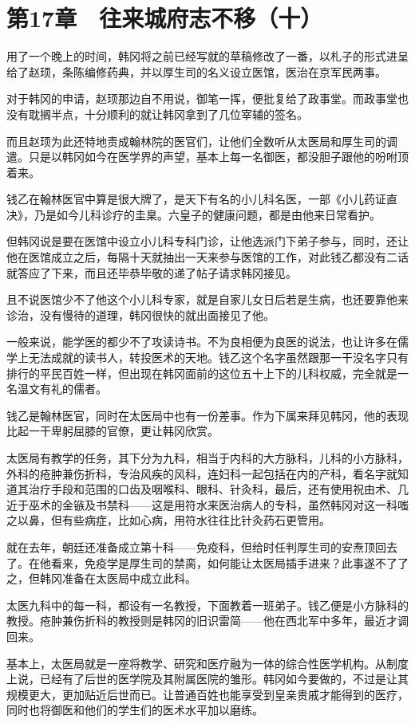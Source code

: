 \section{第17章　往来城府志不移（十）}

用了一个晚上的时间，韩冈将之前已经写就的草稿修改了一番，以札子的形式进呈给了赵顼，条陈编修药典，并以厚生司的名义设立医馆，医治在京军民两事。 

对于韩冈的申请，赵顼那边自不用说，御笔一挥，便批复给了政事堂。而政事堂也没有耽搁半点，十分顺利的就让韩冈拿到了几位宰辅的签名。

而且赵顼为此还特地责成翰林院的医官们，让他们全数听从太医局和厚生司的调遣。只是以韩冈如今在医学界的声望，基本上每一名御医，都没胆子跟他的吩咐顶着来。

钱乙在翰林医官中算是很大牌了，是天下有名的小儿科名医，一部《小儿药证直决》，乃是如今儿科诊疗的圭臬。六皇子的健康问题，都是由他来日常看护。

但韩冈说是要在医馆中设立小儿科专科门诊，让他选派门下弟子参与，同时，还让他在医馆成立之后，每隔十天就抽出一天来参与医馆的工作，对此钱乙都没有二话就答应了下来，而且还毕恭毕敬的递了帖子请求韩冈接见。

且不说医馆少不了他这个小儿科专家，就是自家儿女日后若是生病，也还要靠他来诊治，没有慢待的道理，韩冈很快的就出面接见了他。

一般来说，能学医的都少不了攻读诗书。不为良相便为良医的说法，也让许多在儒学上无法成就的读书人，转投医术的天地。钱乙这个名字虽然跟那一干没名字只有排行的平民百姓一样，但出现在韩冈面前的这位五十上下的儿科权威，完全就是一名温文有礼的儒者。

钱乙是翰林医官，同时在太医局中也有一份差事。作为下属来拜见韩冈，他的表现比起一干卑躬屈膝的官僚，更让韩冈欣赏。

太医局有教学的任务，其下分为九科，相当于内科的大方脉科，儿科的小方脉科，外科的疮肿兼伤折科，专治风疾的风科，连妇科一起包括在内的产科，看名字就知道其治疗手段和范围的口齿及咽喉科、眼科、针灸科，最后，还有使用祝由术、几近于巫术的金镞及书禁科——这是用符水来医治病人的专科，虽然韩冈对这一科嗤之以鼻，但有些病症，比如心病，用符水往往比针灸药石更管用。

就在去年，朝廷还准备成立第十科——免疫科，但给时任判厚生司的安焘顶回去了。在他看来，免疫学是厚生司的禁脔，如何能让太医局插手进来？此事遂不了了之，但韩冈准备在太医局中成立此科。

太医九科中的每一科，都设有一名教授，下面教着一班弟子。钱乙便是小方脉科的教授。疮肿兼伤折科的教授则是韩冈的旧识雷简——他在西北军中多年，最近才调回来。

基本上，太医局就是一座将教学、研究和医疗融为一体的综合性医学机构。从制度上说，已经有了后世的医学院及其附属医院的雏形。韩冈如今要做的，不过是让其规模更大，更加贴近后世而已。让普通百姓也能享受到皇亲贵戚才能得到的医疗，同时也将御医和他们的学生们的医术水平加以磨练。

